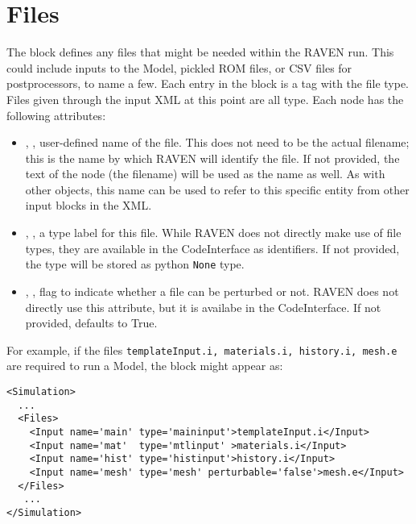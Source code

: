 \section{Files}
\label{sec:files}

The  block defines any files that might be needed within
the RAVEN run.  This could include inputs to the Model, pickled ROM files,
or CSV files for postprocessors, to name a few.
%
Each entry in the  block is a tag with the file type.  Files
given through the input XML at this point are all  type.
Each  node has the following attributes:
\vspace{-5mm}
\begin{itemize}
  \itemsep0em
  \item {}, , user-defined name
  of the file.  This does not need to be the actual filename; this is the name
  by which RAVEN will identify the file.  If not provided, the text
  of the node (the filename) will be used as the name as well.
  \nb As with other objects, this name can be used to refer to this
  specific entity from other input blocks in the XML.
  \item {}, , a type label
  for this file.  While RAVEN does not directly make use of file types, 
  they are available in the CodeInterface as identifiers.  If not provided,
  the type will be stored as python \texttt{None} type.

  \item {}, , flag
  to indicate whether a file can be perturbed or not. RAVEN does not
  directly use this attribute, but it is availabe in the CodeInterface.
  If not provided, defaults to True.
\end{itemize}
\vspace{-5mm}
For example, if the files \texttt{templateInput.i, materials.i, history.i, mesh.e}
 are required to run a Model, the  block might appear as:
\begin{lstlisting}[style=XML,morekeywords={name,file}] %moreemph={name,file}]
<Simulation>
  ...
  <Files>
    <Input name='main' type='maininput'>templateInput.i</Input>
    <Input name='mat'  type='mtlinput' >materials.i</Input>
    <Input name='hist' type='histinput'>history.i</Input>
    <Input name='mesh' type='mesh' perturbable='false'>mesh.e</Input>
  </Files>
   ...
</Simulation>
\end{lstlisting}
